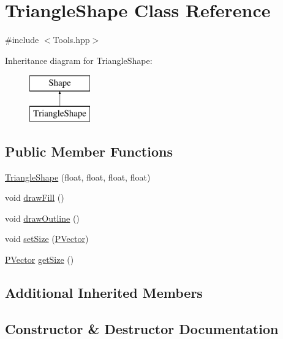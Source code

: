 \hypertarget{class_triangle_shape}{}\section{Triangle\+Shape Class Reference}
\label{class_triangle_shape}


{\ttfamily \#include $<$Tools.\+hpp$>$}

Inheritance diagram for Triangle\+Shape\+:\begin{figure}[H]
\begin{center}
\leavevmode
\includegraphics[height=2.000000cm]{class_triangle_shape}
\end{center}
\end{figure}
\subsection*{Public Member Functions}
\begin{DoxyCompactItemize}
\item 
\hyperlink{class_triangle_shape_a0742fc5cefcf87ec714df887eac1063b}{Triangle\+Shape} (float, float, float, float)
\item 
void \hyperlink{class_triangle_shape_a1405e2b1b5d9c9e8283156eec6cbf021}{draw\+Fill} ()
\item 
void \hyperlink{class_triangle_shape_add481f7167360aeeaf411d714c9d68be}{draw\+Outline} ()
\item 
void \hyperlink{class_triangle_shape_abd78b976444ddf526b839a5d4706ff5c}{set\+Size} (\hyperlink{struct_p_vector}{P\+Vector})
\item 
\hyperlink{struct_p_vector}{P\+Vector} \hyperlink{class_triangle_shape_aa0d2b84703d859f14c73023315bd3896}{get\+Size} ()
\end{DoxyCompactItemize}
\subsection*{Additional Inherited Members}


\subsection{Constructor \& Destructor Documentation}
\hypertarget{class_triangle_shape_a0742fc5cefcf87ec714df887eac1063b}{}\label{class_triangle_shape_a0742fc5cefcf87ec714df887eac1063b} 
